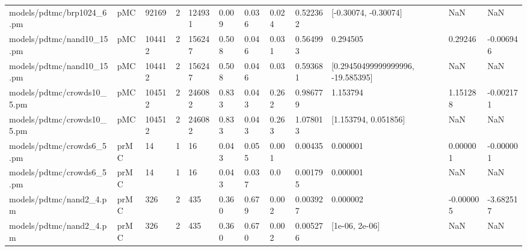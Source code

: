 \begin{tabular}{llllllllllll}
                         models/pdtmc/brp1024\_6.pm &  pMC &  92169 &          2 &      124931 &          0.009 &            0.036 &                        0.024 &       0.522362 &                               [-0.30074, -0.30074] &                NaN &          NaN \\
                         models/pdtmc/nand10\_15.pm &  pMC & 104412 &          2 &      156247 &          0.508 &            0.046 &                        0.031 &       0.564993 &                                           0.294505 &            0.29246 &    -0.006946 \\
                         models/pdtmc/nand10\_15.pm &  pMC & 104412 &          2 &      156247 &          0.508 &            0.046 &                         0.03 &       0.593681 &                  [0.29450499999999996, -19.585395] &                NaN &          NaN \\
                        models/pdtmc/crowds10\_5.pm &  pMC & 104512 &          2 &      246082 &          0.833 &            0.043 &                        0.262 &       0.986779 &                                           1.153794 &           1.151288 &    -0.002171 \\
                        models/pdtmc/crowds10\_5.pm &  pMC & 104512 &          2 &      246082 &          0.833 &            0.043 &                        0.263 &       1.078013 &                               [1.153794, 0.051856] &                NaN &          NaN \\
                         models/pdtmc/crowds6\_5.pm & prMC &     14 &          1 &          16 &          0.043 &            0.055 &                        0.001 &        0.00435 &                                           0.000001 &           0.000001 &    -0.000001 \\
                         models/pdtmc/crowds6\_5.pm & prMC &     14 &          1 &          16 &          0.043 &            0.037 &                          0.0 &       0.001795 &                                           0.000001 &                NaN &          NaN \\
                           models/pdtmc/nand2\_4.pm & prMC &    326 &          2 &         435 &          0.360 &            0.679 &                        0.002 &       0.003927 &                                           0.000002 &          -0.000005 &    -3.682517 \\
                           models/pdtmc/nand2\_4.pm & prMC &    326 &          2 &         435 &          0.360 &            0.670 &                        0.002 &       0.005276 &                                     [1e-06, 2e-06] &                NaN &          NaN \\

\end{tabular}
